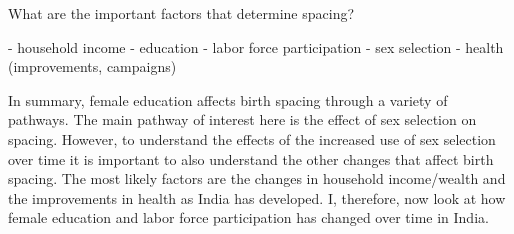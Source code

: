 What are the important factors that determine spacing?

- household income
- education
- labor force participation
- sex selection
- health (improvements, campaigns)


In summary, female education affects birth spacing through a variety of pathways.
The main pathway of interest here is the effect of sex selection on spacing.
However, to understand the effects of the increased use of sex selection over time it
is important to also understand the other changes that affect birth spacing.
The most likely factors are the changes in household income/wealth and the improvements
in health as India has developed.
I, therefore, now look at how female education and labor force participation has changed
over time in India.



